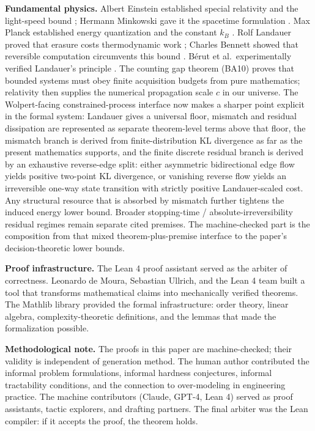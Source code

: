 \textbf{Fundamental physics.} Albert Einstein established special relativity and the light-speed bound \cite{einstein1905electrodynamics}; Hermann Minkowski gave it the spacetime formulation \cite{minkowski1908space}. Max Planck established energy quantization and the constant $k_B$ \cite{planck1901distribution}. Rolf Landauer proved that erasure costs thermodynamic work \cite{landauer1961irreversibility}; Charles Bennett showed that reversible computation circumvents this bound \cite{bennett1982thermodynamics}. Bérut et al.\ experimentally verified Landauer's principle \cite{berut2012experimental}. The counting gap theorem (BA10) proves that bounded systems must obey finite acquisition budgets from pure mathematics; relativity then supplies the numerical propagation scale $c$ in our universe. The Wolpert-facing constrained-process interface now makes a sharper point explicit in the formal system: Landauer gives a universal floor, mismatch and residual dissipation are represented as separate theorem-level terms above that floor, the mismatch branch is derived from finite-distribution KL divergence as far as the present mathematics supports, and the finite discrete residual branch is derived by an exhaustive reverse-edge split: either asymmetric bidirectional edge flow yields positive two-point KL divergence, or vanishing reverse flow yields an irreversible one-way state transition with strictly positive Landauer-scaled cost. Any structural resource that is absorbed by mismatch further tightens the induced energy lower bound. Broader stopping-time / absolute-irreversibility residual regimes remain separate cited premises. The machine-checked part is the composition from that mixed theorem-plus-premise interface to the paper's decision-theoretic lower bounds.

\textbf{Proof infrastructure.} The Lean 4 proof assistant \cite{demoura2021lean4} served as the arbiter of correctness. Leonardo de Moura, Sebastian Ullrich, and the Lean 4 team built a tool that transforms mathematical claims into mechanically verified theorems. The Mathlib library \cite{mathlib2020} provided the formal infrastructure: order theory, linear algebra, complexity-theoretic definitions, and the lemmas that made the formalization possible.

\textbf{Methodological note.} The proofs in this paper are machine-checked; their validity is independent of generation method. The human author contributed the informal problem formulations, informal hardness conjectures, informal tractability conditions, and the connection to over-modeling in engineering practice. The machine contributors (Claude, GPT-4, Lean 4) served as proof assistants, tactic explorers, and drafting partners. The final arbiter was the Lean compiler: if it accepts the proof, the theorem holds.

